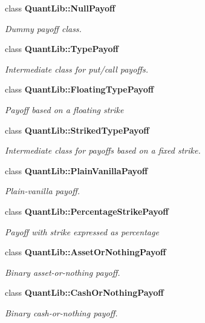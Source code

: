 \begin{DoxyCompactItemize}
\item 
class {\bf Quant\+Lib\+::\+Null\+Payoff}
\begin{DoxyCompactList}\small\item\em Dummy payoff class. \end{DoxyCompactList}\item 
class {\bf Quant\+Lib\+::\+Type\+Payoff}
\begin{DoxyCompactList}\small\item\em Intermediate class for put/call payoffs. \end{DoxyCompactList}\item 
class {\bf Quant\+Lib\+::\+Floating\+Type\+Payoff}
\begin{DoxyCompactList}\small\item\em Payoff based on a floating strike \end{DoxyCompactList}\item 
class {\bf Quant\+Lib\+::\+Striked\+Type\+Payoff}
\begin{DoxyCompactList}\small\item\em Intermediate class for payoffs based on a fixed strike. \end{DoxyCompactList}\item 
class {\bf Quant\+Lib\+::\+Plain\+Vanilla\+Payoff}
\begin{DoxyCompactList}\small\item\em Plain-\/vanilla payoff. \end{DoxyCompactList}\item 
class {\bf Quant\+Lib\+::\+Percentage\+Strike\+Payoff}
\begin{DoxyCompactList}\small\item\em Payoff with strike expressed as percentage \end{DoxyCompactList}\item 
class {\bf Quant\+Lib\+::\+Asset\+Or\+Nothing\+Payoff}
\begin{DoxyCompactList}\small\item\em Binary asset-\/or-\/nothing payoff. \end{DoxyCompactList}\item 
class {\bf Quant\+Lib\+::\+Cash\+Or\+Nothing\+Payoff}
\begin{DoxyCompactList}\small\item\em Binary cash-\/or-\/nothing payoff. \end{DoxyCompactList}\item 

\end{DoxyCompactItemize}
